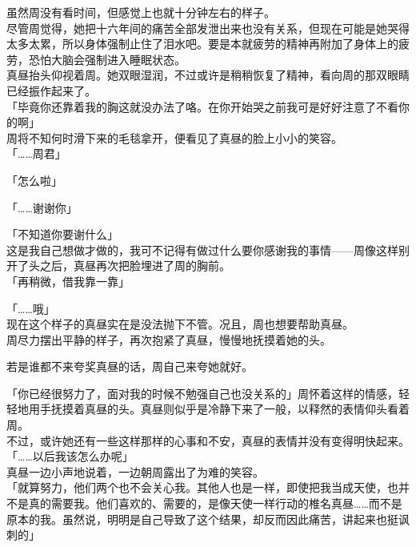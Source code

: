 虽然周没有看时间，但感觉上也就十分钟左右的样子。\\

尽管周觉得，她把十六年间的痛苦全部发泄出来也没有关系，但现在可能是她哭得太多太累，所以身体强制止住了泪水吧。要是本就疲劳的精神再附加了身体上的疲劳，恐怕大脑会强制进入睡眠状态。\\

真昼抬头仰视着周。她双眼湿润，不过或许是稍稍恢复了精神，看向周的那双眼睛已经振作起来了。\\

「毕竟你还靠着我的胸这就没办法了咯。在你开始哭之前我可是好好注意了不看你的啊」\\

周将不知何时滑下来的毛毯拿开，便看见了真昼的脸上小小的笑容。\\

「……周君」

「怎么啦」

「……谢谢你」

「不知道你要谢什么」\\

这是我自己想做才做的，我可不记得有做过什么要你感谢我的事情——周像这样别开了头之后，真昼再次把脸埋进了周的胸前。\\

「再稍微，借我靠一靠」

「……哦」\\

现在这个样子的真昼实在是没法抛下不管。况且，周也想要帮助真昼。\\

周尽力摆出平静的样子，再次抱紧了真昼，慢慢地抚摸着她的头。

若是谁都不来夸奖真昼的话，周自己来夸她就好。

「你已经很努力了，面对我的时候不勉强自己也没关系的」周怀着这样的情感，轻轻地用手抚摸着真昼的头。真昼则似乎是冷静下来了一般，以释然的表情仰头看着周。\\

不过，或许她还有一些这样那样的心事和不安，真昼的表情并没有变得明快起来。\\

「……以后我该怎么办呢」\\

真昼一边小声地说着，一边朝周露出了为难的笑容。\\

「就算努力，他们两个也不会关心我。其他人也是一样，即使把我当成天使，也并不是真的需要我。他们喜欢的、需要的，是像天使一样行动的椎名真昼……而不是原本的我。虽然说，明明是自己导致了这个结果，却反而因此痛苦，讲起来也挺讽刺的」\\

